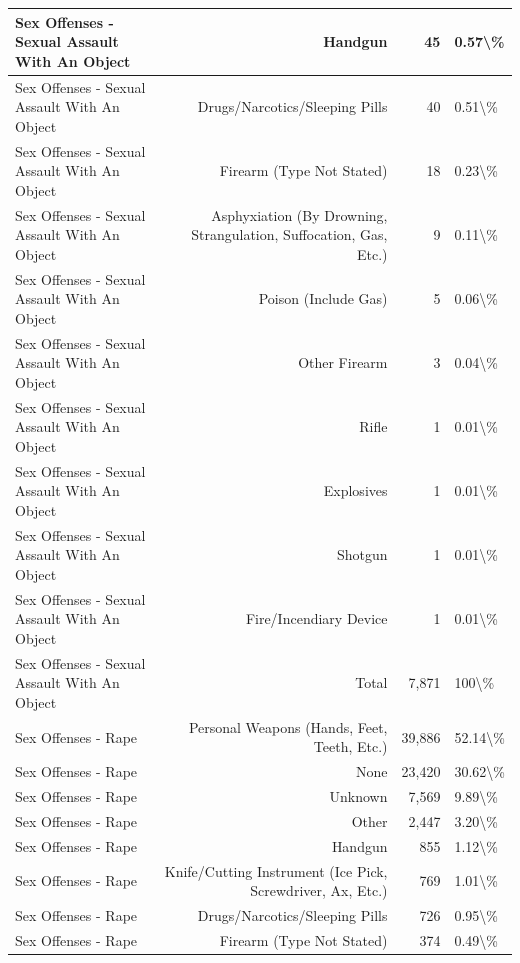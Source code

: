 \documentclass[
]{krantz}
\begin{document}
\begin{longtable}[t]{l|r|r|l}
\hline
Sex Offenses - Sexual Assault With An Object & Handgun & 45 & 0.57\textbackslash{}\%\\
\hline
Sex Offenses - Sexual Assault With An Object & Drugs/Narcotics/Sleeping Pills & 40 & 0.51\textbackslash{}\%\\
\hline
Sex Offenses - Sexual Assault With An Object & Firearm (Type Not Stated) & 18 & 0.23\textbackslash{}\%\\
\hline
Sex Offenses - Sexual Assault With An Object & Asphyxiation (By Drowning, Strangulation, Suffocation, Gas, Etc.) & 9 & 0.11\textbackslash{}\%\\
\hline
Sex Offenses - Sexual Assault With An Object & Poison (Include Gas) & 5 & 0.06\textbackslash{}\%\\
\hline
Sex Offenses - Sexual Assault With An Object & Other Firearm & 3 & 0.04\textbackslash{}\%\\
\hline
Sex Offenses - Sexual Assault With An Object & Rifle & 1 & 0.01\textbackslash{}\%\\
\hline
Sex Offenses - Sexual Assault With An Object & Explosives & 1 & 0.01\textbackslash{}\%\\
\hline
Sex Offenses - Sexual Assault With An Object & Shotgun & 1 & 0.01\textbackslash{}\%\\
\hline
Sex Offenses - Sexual Assault With An Object & Fire/Incendiary Device & 1 & 0.01\textbackslash{}\%\\
\hline
Sex Offenses - Sexual Assault With An Object & Total & 7,871 & 100\textbackslash{}\%\\
\hline
Sex Offenses - Rape & Personal Weapons (Hands, Feet, Teeth, Etc.) & 39,886 & 52.14\textbackslash{}\%\\
\hline
Sex Offenses - Rape & None & 23,420 & 30.62\textbackslash{}\%\\
\hline
Sex Offenses - Rape & Unknown & 7,569 & 9.89\textbackslash{}\%\\
\hline
Sex Offenses - Rape & Other & 2,447 & 3.20\textbackslash{}\%\\
\hline
Sex Offenses - Rape & Handgun & 855 & 1.12\textbackslash{}\%\\
\hline
Sex Offenses - Rape & Knife/Cutting Instrument (Ice Pick, Screwdriver, Ax, Etc.) & 769 & 1.01\textbackslash{}\%\\
\hline
Sex Offenses - Rape & Drugs/Narcotics/Sleeping Pills & 726 & 0.95\textbackslash{}\%\\
\hline
Sex Offenses - Rape & Firearm (Type Not Stated) & 374 & 0.49\textbackslash{}\%\\

\end{longtable}
\end{document}
